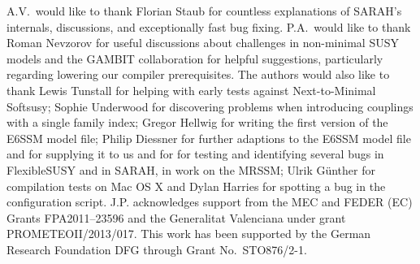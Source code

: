 \documentclass[final,3p,11pt,pdflatex]{elsarticle}
\makeatletter
\newcommand{\fs}{FlexibleSUSY\@\xspace}
\makeatother
\begin{document}
A.V.\ would like to thank Florian Staub for countless explanations of
SARAH's internals, discussions, and exceptionally fast bug
fixing. P.A.~would like to thank Roman Nevzorov for useful discussions
about challenges in non-minimal SUSY models and the GAMBIT
collaboration for helpful suggestions, particularly regarding
lowering our compiler prerequisites. The authors would also like to
thank Lewis Tunstall for helping with early tests against
Next-to-Minimal Softsusy; Sophie Underwood for discovering problems
when introducing couplings with a single family index; Gregor Hellwig
for writing the first version of the E6SSM model file; Philip Diessner
for further adaptions to the E6SSM model file and for supplying it to
us and for for testing and identifying several bugs in \fs and in
SARAH, in work on the MRSSM; Ulrik Günther for compilation tests on
Mac OS X and Dylan Harries for spotting a bug in the configuration
script.
%
J.P. acknowledges support from the MEC and FEDER (EC) Grants
FPA2011--23596 and the Generalitat Valenciana under grant PROMETEOII/2013/017.
This work has been supported by the German Research Foundation DFG
through Grant No.~STO876/2-1.

\appendix
\end{document}
